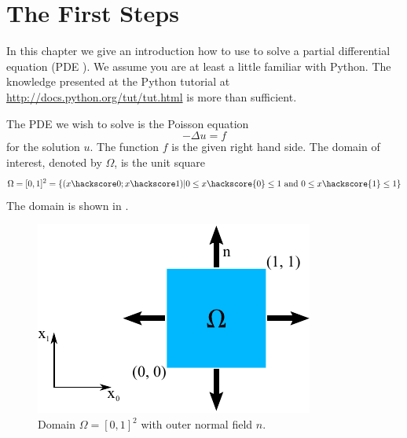
%
%
%


\section{The First Steps}
\label{FirstSteps} 



In this chapter we give an introduction how to use \escript to solve 
a partial differential equation  (PDE ). We assume you are at least a little familiar with Python. The knowledge presented at the Python tutorial at \url{http://docs.python.org/tut/tut.html}
is more than sufficient.

The PDE  we wish to solve is the Poisson equation  
\begin{equation}
-\Delta u =f 
\label{eq:FirstSteps.1}
\end{equation}
for the solution $u$. The function $f$ is the given right hand side. The domain of interest, denoted by $\Omega$,
is the unit square 
\begin{equation}
\Omega=[0,1]^2=\{ (x\hackscore 0;x\hackscore 1) | 0\le x\hackscore{0} \le 1 \mbox{ and } 0\le x\hackscore{1} \le 1 \}
\label{eq:FirstSteps.1b}
\end{equation}
The domain is shown in .
\begin{figure} [ht]
\centerline{\includegraphics[width=\figwidth]{figures/FirstStepDomain}}
\caption{Domain $\Omega=[0,1]^2$ with outer normal field $n$.}
\label{fig:FirstSteps.1}
\end{figure}

